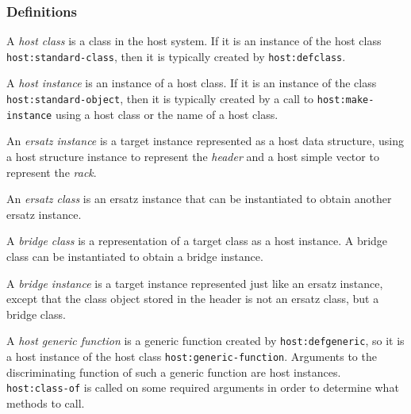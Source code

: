 \subsubsection{Definitions}

\begin{definition}
A \emph{host class} is a class in the host system.  If it is an
instance of the host class \texttt{host:standard-class}, then
it is typically created by \texttt{host:defclass}.
\end{definition}

\begin{definition}
A \emph{host instance} is an instance of a host class.  If it is an
instance of the class \texttt{host:standard-object}, then it is
typically created by a call to \texttt{host:make-instance} using a
host class or the name of a host class.
\end{definition}

\begin{definition}
An \emph{ersatz instance} is a target instance represented as a host
data structure, using a host structure instance to represent the
\emph{header} and a host simple vector to represent the \emph{rack}.
\end{definition}

\begin{definition}
An \emph{ersatz class} is an ersatz instance that can be instantiated
to obtain another ersatz instance.
\end{definition}

\begin{definition}
A \emph{bridge class} is a representation of a target class as a host
instance.  A bridge class can be instantiated to obtain a bridge
instance. 
\end{definition}

\begin{definition}
A \emph{bridge instance} is a target instance represented just like an
ersatz instance, except that the class object stored in the header is
not an ersatz class, but a bridge class. 
\end{definition}

\begin{definition}
A \emph{host generic function} is a generic function created by
\texttt{host:defgeneric}, so it is a host instance of the host class
\texttt{host:generic-function}.  Arguments to the discriminating
function of such a generic function are host instances.
\texttt{host:class-of} is called on some required arguments in order
to determine what methods to call.
\end{definition}

